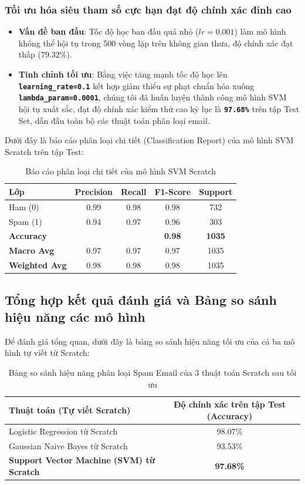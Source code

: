 \documentclass[a4paper]{article}
\begin{document}
\subsubsection{Tối ưu hóa siêu tham số cực hạn đạt độ chính xác đỉnh cao}
\begin{itemize}
    \item \textbf{Vấn đề ban đầu}: Tốc độ học ban đầu quá nhỏ ($lr=0.001$) làm mô hình không thể hội tụ trong 500 vòng lặp trên không gian thưa, độ chính xác đạt thấp ($79.32\%$).
    \item \textbf{Tinh chỉnh tối ưu}: Bằng việc tăng mạnh tốc độ học lên \textbf{\texttt{learning\_rate=0.1}} kết hợp giảm thiểu sự phạt chuẩn hóa xuống \textbf{\texttt{lambda\_param=0.0001}}, chúng tôi đã huấn luyện thành công mô hình SVM hội tụ xuất sắc, đạt độ chính xác kiểm thử cao kỷ lục là \textbf{\texttt{97.68\%}} trên tập Test Set, dẫn đầu toàn bộ các thuật toán phân loại email.
\end{itemize}

Dưới đây là báo cáo phân loại chi tiết (Classification Report) của mô hình SVM Scratch trên tập Test:

\begin{table}[H]
\centering
\caption{Báo cáo phân loại chi tiết của mô hình SVM Scratch}
\label{tab:spam_svm_report}
\begin{tabular}{lcccc}
\toprule
\textbf{Lớp} & \textbf{Precision} & \textbf{Recall} & \textbf{F1-Score} & \textbf{Support} \\ \midrule
Ham (0) & 0.99 & 0.98 & 0.98 & 732 \\
Spam (1) & 0.94 & 0.97 & 0.96 & 303 \\ \midrule
\textbf{Accuracy} &  &  & \textbf{0.98} & \textbf{1035} \\
\textbf{Macro Avg} & 0.97 & 0.97 & 0.97 & 1035 \\
\textbf{Weighted Avg} & 0.98 & 0.98 & 0.98 & 1035 \\ \bottomrule
\end{tabular}
\end{table}

\subsection{Tổng hợp kết quả đánh giá và Bảng so sánh hiệu năng các mô hình}
Để đánh giá tổng quan, dưới đây là bảng so sánh hiệu năng tối ưu của cả ba mô hình tự viết từ Scratch:

\begin{table}[H]
\centering
\caption{Bảng so sánh hiệu năng phân loại Spam Email của 3 thuật toán Scratch sau tối ưu}
\label{tab:spam_results_final_table}
\begin{tabular}{lc}
\toprule
\textbf{Thuật toán (Tự viết Scratch)} & \textbf{Độ chính xác trên tập Test (Accuracy)} \\ \midrule
Logistic Regression từ Scratch & 98.07\% \\
Gaussian Naive Bayes từ Scratch & 93.53\% \\
\textbf{Support Vector Machine (SVM) từ Scratch} & \textbf{97.68\%} \\ \bottomrule
\end{tabular}
\end{table}
\end{document}
